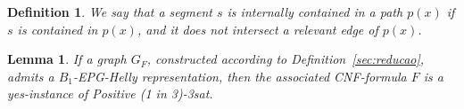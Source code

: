 \documentclass[9pt]{entcs}
\newtheorem{lema}{Lemma}[section]
\newtheorem{defi}{Definition}[section]
\newtheorem{fac}{Fact}[section]
\begin{document}
% 




\begin{defi}
We say that a segment $s$ is \emph{internally contained} in a path $p(x)$ if $s$ is contained in $p(x)$, and it does not intersect a relevant edge of $p(x)$. 
\end{defi}



\begin{lema}\label{lem:volta}
If a graph $G_F$, constructed according to Definition~\ref{sec:reducao}, admits a $B_1$-EPG-Helly representation, then the associated CNF-formula $F$ is a yes-instance of {\sc Positive (1 in 3)-3sat}.
\end{lema}
\end{document}
